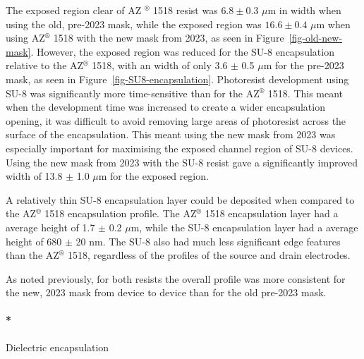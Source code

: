 \documentclass[
  letterpaper,
  DIV=11,
  numbers=noendperiod]{scrartcl}
\let\oldparagraph\paragraph
\renewcommand{\paragraph}[1]{\oldparagraph{#1}\mbox{}}
\begin{document}
The exposed region clear of AZ \(^\circledR\) 1518 resist was
\(6.8 \pm 0.3\) \(\mu\)m in width when using the old, pre-2023 mask,
while the exposed region was \(16.6 \pm 0.4\) \(\mu\)m when using
AZ\(^\circledR\) 1518 with the new mask from 2023, as seen in
Figure~\ref{fig-old-new-mask}. However, the exposed region was reduced
for the SU-8 encapsulation relative to the AZ\(^\circledR\) 1518, with
an width of only 3.6 \(\pm\) 0.5 \(\mu\)m for the pre-2023 mask, as seen
in Figure~\ref{fig-SU8-encapsulation}. Photoresist development using
SU-8 was significantly more time-sensitive than for the AZ\(^\circledR\)
1518. This meant when the development time was increased to create a
wider encapsulation opening, it was difficult to avoid removing large
areas of photoresist across the surface of the encapsulation. This meant
using the new mask from 2023 was especially important for maximising the
exposed channel region of SU-8 devices. Using the new mask from 2023
with the SU-8 resist gave a significantly improved width of 13.8 \(\pm\)
1.0 \(\mu\)m for the exposed region.

A relatively thin SU-8 encapsulation layer could be deposited when
compared to the AZ\(^\circledR\) 1518 encapsulation profile. The
AZ\(^\circledR\) 1518 encapsulation layer had a average height of 1.7
\(\pm\) 0.2 \(\mu\)m, while the SU-8 encapsulation layer had a average
height of 680 \(\pm\) 20 nm. The SU-8 also had much less significant
edge features than the AZ\(^\circledR\) 1518, regardless of the profiles
of the source and drain electrodes.

As noted previously, for both resists the overall profile was more
consistent for the new, 2023 mask from device to device than for the old
pre-2023 mask.

\hypertarget{dielectric-encapsulation}{%
\paragraph*{Dielectric encapsulation}\label{dielectric-encapsulation}}
\end{document}
